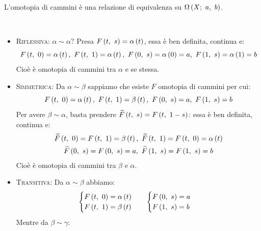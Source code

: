 \begin{observe}
	L'omotopia di cammini è una relazione di equivalenza su $\Omega\left(X;\ a,\ b\right)$.
\end{observe}
\begin{demonstration}~{}
		\begin{itemize}
		\item \textsc{Riflessiva}: $\alpha\sim \alpha ?$ Presa $F\left(t,\ s\right)=\alpha\left(t\right)$, essa è ben definita, continua e:
		\begin{equation*}
			\mvf{F}{t}{0}=\alpha\left(t\right),\ \mvf{F}{t}{1}=\alpha\left(t\right),\ \mvf{F}{0}{s}=\alpha\left(0\right)=a,\ \mvf{F}{1}{s}=\alpha\left(1\right)=b
		\end{equation*}
	Cioè è omotopia di cammini tra $\alpha$ e se stessa.
		\item \textsc{Simmetrica}: Da $\alpha\sim \beta$ sappiamo che esiste $F$ omotopia di cammini per cui:
		\begin{equation*}
			\mvf{F}{t}{0}=\alpha\left(t\right),\ \mvf{F}{t}{1}=\beta\left(t\right),\ \mvf{F}{0}{s}=a,\ \mvf{F}{1}{s}=b
		\end{equation*}
		Per avere $\beta\sim \alpha$, basta prendere $\widetilde{F}\left(t,\ s\right)=F\left(t,\ 1-s\right)$: essa è ben definita, continua e:
		\begin{gather*}
			\mvf{\widetilde{F}}{t}{0}=\mvf{F}{t}{1}=\beta\left(t\right),\ \mvf{\widetilde{F}}{t}{1}=\mvf{F}{t}{0}=\alpha\left(t\right)\\\mvf{\widetilde{F}}{0}{s}=\mvf{F}{0}{s}=a,\ \mvf{\widetilde{F}}{1}{s}=\mvf{F}{1}{s}=b
		\end{gather*}
		Cioè è omotopia di cammini tra $\beta$ e $\alpha$.
		\item \textsc{Transitiva}: Da $\alpha\sim \beta$ abbiamo:
	\begin{equation*}
			\begin{array}{ll}
			\begin{cases}
				F\left(t,\ 0\right)=\alpha\left(t\right)\\
				F\left(t,\ 1\right)=\beta\left(t\right)
			\end{cases}&
		\begin{cases}
				F\left(0,\ s\right)=a\\
				F\left(1,\ s\right)=b
		\end{cases}
			\end{array}
	\end{equation*}
Mentre da $\beta\sim \gamma$:
	\begin{equation*}
	\begin{array}{ll}

\end{array}
\end{equation*}
\end{itemize}
\end{demonstration}
